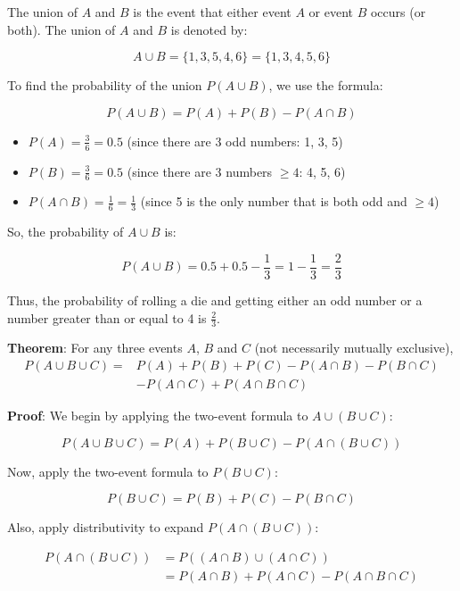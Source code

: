 \documentclass[twoside]{book}
\begin{document}
The union of \( A \) and \( B \) is the event that either event \( A \) or event \( B \) occurs (or both). The union of \( A \) and \( B \) is denoted by:

\[
A \cup B = \{1, 3, 5, 4, 6\} = \{1, 3, 4, 5, 6\}
\]

To find the probability of the union \( P(A \cup B) \), we use the formula:

\[
P(A \cup B) = P(A) + P(B) - P(A \cap B)
\]

\begin{itemize}
    \item \( P(A) = \frac{3}{6} = 0.5 \) (since there are 3 odd numbers: 1, 3, 5)
    \item \( P(B) = \frac{3}{6} = 0.5 \) (since there are 3 numbers \( \geq 4 \): 4, 5, 6)
    \item \( P(A \cap B) = \frac{1}{6} = \frac{1}{3} \) (since 5 is the only number that is both odd and \( \geq 4 \))
\end{itemize}

So, the probability of \( A \cup B \) is:

\[
P(A \cup B) = 0.5 + 0.5 - \frac{1}{3} = 1 - \frac{1}{3} = \frac{2}{3}
\]

Thus, the probability of rolling a die and getting either an odd number or a number greater than or equal to 4 is \( \frac{2}{3} \).


\begin{textbox}
\textbf{Theorem}: For any three events $A$, $B$ and $C$ (not necessarily mutually exclusive),
\begin{align*}
    P(A \cup B \cup C) = &P(A) + P(B) +P(C) - P(A \cap B) - P(B \cap C) \\
    &- P(A \cap C)  + P(A \cap B \cap C)
\end{align*}
\end{textbox}

\textbf{Proof}: We begin by applying the two-event formula to $A \cup (B \cup C)$:

$$P(A \cup B \cup C) = P(A) + P(B \cup C) - P(A \cap (B \cup C))$$

Now, apply the two-event formula to $P(B \cup C)$:

$$P(B \cup C) = P(B) + P(C) - P(B \cap C)$$

Also, apply distributivity to expand \( P(A \cap (B \cup C)) \):

\begin{align*}
P(A \cap (B \cup C)) &= P((A \cap B) \cup (A \cap C)) \\
&= P(A \cap B) + P(A \cap C) - P(A \cap B \cap C)
\end{align*}
\end{document}
